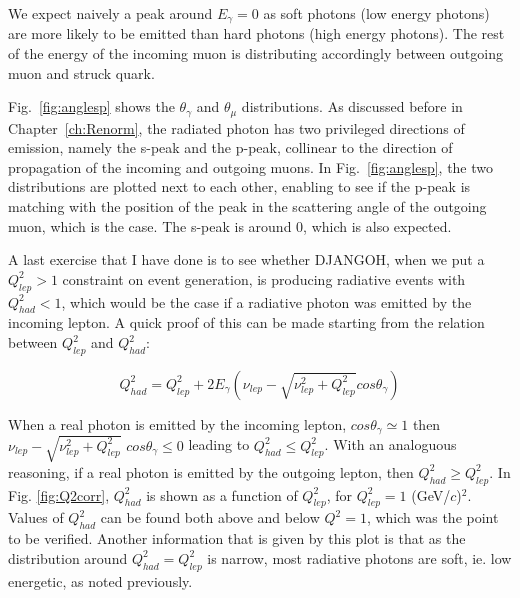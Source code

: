 We expect naively a peak around $E_{\gamma} = 0$ as soft photons (low energy photons) are more likely to be emitted than hard photons (high energy photons). The rest of the energy of the incoming muon is distributing accordingly between outgoing muon and struck quark.

Fig.~\ref{fig:anglesp} shows the $\theta_{\gamma}$ and $\theta_{\mu}$
distributions. As discussed before in Chapter~\ref{ch:Renorm}, the radiated photon has two privileged directions of emission, namely the s-peak and the p-peak, collinear to the direction of propagation of the incoming and outgoing muons. In Fig.~\ref{fig:anglesp}, the two distributions are plotted next to each other, enabling to see if the p-peak is matching with the position of the peak in the scattering angle of the outgoing muon, which is the case. The s-peak is around $0$, which is also expected.

A last exercise that I have done is to see whether DJANGOH, when we put a $Q^2_{lep}>1$ constraint on event generation, is producing radiative events with $Q^2_{had}<1$, which would be the case if a radiative photon was emitted by the incoming lepton. A quick proof of this can be made starting from the relation between $Q^2_{lep}$ and $Q^2_{had}$:

\[Q^2_{had}=Q^2_{lep}+2E_\gamma(\nu_{lep}-\sqrt{\nu_{lep}^2+Q^2_{lep}}cos\theta_\gamma)\]

When a real photon is emitted by the incoming lepton, $cos\theta_\gamma \simeq 1$ then $\nu_{lep}-\sqrt{\nu_{lep}^2+Q^2_{lep}}$
$cos\theta_\gamma \leq 0$ leading to $Q^2_{had} \leq Q^2_{lep}$. With an analoguous reasoning, if a real photon is emitted by the outgoing lepton, then $Q^2_{had} \geq Q^2_{lep}$. In Fig. \ref{fig:Q2corr}, $Q^2_{had}$ is shown as a function of $Q^2_{lep}$, for $Q^2_{lep}=1$ (GeV/$c$)$^2$. Values of $Q^2_{had}$ can be found both above and below $Q^2=1$, which was the point to be verified. Another information that is given by this plot is that as the distribution around $Q^2_{had} = Q^2_{lep}$ is narrow, most radiative photons are soft, ie. low energetic, as noted previously.

